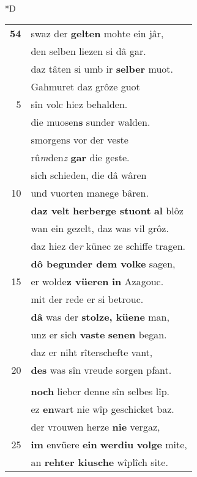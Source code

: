 \documentclass[8pt,a4paper,notitlepage]{article}
\begin{document}
\begin{table}[ht]
\begin{minipage}[t]{0.5\linewidth}
\small
\begin{center}*D
\end{center}
\begin{tabular}{rl}
\textbf{54} & swaz der \textbf{gelten} mohte ein jâr,\\ 
 & den selben liezen si dâ gar.\\ 
 & daz tâten si umb ir \textbf{selber} muot.\\ 
 & Gahmuret daz grôze guot\\ 
5 & sîn volc hiez behalden.\\ 
 & die muosen\textbf{s} sunder walden.\\ 
 & smorgens vor der veste\\ 
 & rû\textit{m}den\textit{z} \textbf{gar} die geste.\\ 
 & sich schieden, die dâ wâren\\ 
10 & und vuorten manege bâren.\\ 
 & \textbf{daz velt} \textbf{herberge stuont} \textbf{al} blôz\\ 
 & wan ein gezelt, daz was vil grôz.\\ 
 & daz hiez de\textit{r} künec ze schiffe tragen.\\ 
 & \textbf{dô begunder dem volke} sagen,\\ 
15 & er wolde\textbf{z vüeren} \textbf{in} Azagouc.\\ 
 & mit der rede er si betrouc.\\ 
 & \textbf{dâ} was der \textbf{stolze, küene} man,\\ 
 & unz er sich \textbf{vaste} \textbf{senen} began.\\ 
 & daz er niht rîterschefte vant,\\ 
20 & \textbf{des} was sîn vreude sorgen pfant.\\ 
 & \textbf{\textit{\begin{large}D\end{large}}och} was im daz swarze wîp\\ 
 & \textbf{noch} lieber denne sîn selbes lîp.\\ 
 & ez \textbf{en}wart nie wîp geschicket baz.\\ 
 & der vrouwen herze \textbf{nie} vergaz,\\ 
25 & \textbf{im} envüere \textbf{ein} \textbf{werdiu} \textbf{volge} mite,\\ 
 & an \textbf{rehter kiusche} wîplîch site.\\ 

\end{tabular}
\end{minipage}
\end{table}
\end{document}
